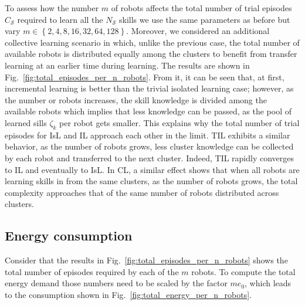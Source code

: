 To assess how the number $m$ of robots affects the total number of trial episodes $C_\mathcal{S}$ required to learn all the $N_\mathcal{S}$ skills we use the same parameters as before but vary $m \in \left \lbrace 2,4,8,16,32,64,128\right \rbrace$. Moreover, we considered an additional collective learning scenario in which, unlike the previous case, the total number of available robots is distributed equally among the clusters to benefit from transfer learning at an earlier time during learning. The results are shown in Fig.~\ref{fig:total_episodes_per_n_robots}. From it, it can be seen that, at first, incremental learning is better than the trivial isolated learning case; however, as the number or robots increases, the skill knowledge is divided among the available robots which implies that less knowledge can be passed, as the pool of learned sills $\zeta_k$ per robot gets smaller. This explains why the total number of trial episodes for IsL and IL approach each other in the limit. TIL exhibits a similar behavior, as the number of robots grows, less cluster knowledge can be collected by each robot and transferred to the next cluster. Indeed, TIL rapidly converges to IL and eventually to IsL. In CL, a similar effect shows that when all robots are learning skills in from the same clusters, as the number of robots grows, the total complexity approaches that of the same number of robots distributed across clusters.


\subsection{Energy consumption}
Consider that the results in Fig.~\ref{fig:total_episodes_per_n_robots} shows the total number of episodes required by each of the $m$ robots. To compute the total energy demand those numbers need to be scaled by the factor $m e_0$, which leads to the consumption shown in Fig.~\ref{fig:total_energy_per_n_robots}.

